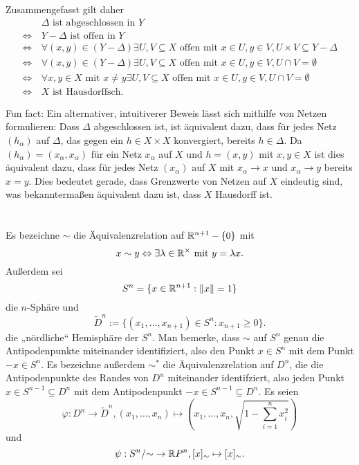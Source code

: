\documentclass[a4paper,10pt]{article}
\begin{document}
Zusammengefasst gilt daher
\begin{align*}
                &\, \Delta \text{ ist abgeschlossen in } Y \\
 \Leftrightarrow&\, Y-\Delta \text{ ist offen in } Y \\
 \Leftrightarrow&\, \forall (x,y) \in (Y-\Delta) \exists U,V \subseteq X \text{ offen mit } x \in U, y \in V, U \times V \subseteq Y-\Delta \\
 \Leftrightarrow&\, \forall (x,y) \in (Y-\Delta) \exists U,V \subseteq X \text{ offen mit } x \in U, y \in V, U \cap V = \emptyset \\
 \Leftrightarrow&\, \forall x,y \in X \text{ mit } x \neq y \exists U,V \subseteq X \text{ offen mit } x \in U, y \in V, U \cap V = \emptyset \\
 \Leftrightarrow&\, X \text{ ist Hausdorffsch.}
\end{align*}

Fun fact: Ein alternativer, intuitiverer Beweis lässt sich mithilfe von Netzen formulieren: Dass $\Delta$ abgeschlossen ist, ist äquivalent dazu, dass für jedes Netz $(h_\alpha)$ auf $\Delta$, das gegen ein $h \in X \times X$ konvergiert, bereits $h \in \Delta$. Da $(h_\alpha) = (x_\alpha, x_\alpha)$ für ein Netz $x_\alpha$ auf $X$ und $h = (x,y)$ mit $x,y \in X$ ist dies äquivalent dazu, dass für jedes Netz $(x_\alpha)$ auf $X$ mit $x_\alpha \to x$ und $x_\alpha \to y$ bereits $x = y$. Dies bedeutet gerade, dass Grenzwerte von Netzen auf $X$ eindeutig sind, was bekanntermaßen äquivalent dazu ist, dass $X$ Hausdorff ist.





\section{}
Es bezeichne $\sim$ die Äquivalenzrelation auf $\mathbb{R}^{n+1} - \{0\}$ mit
\[
 x \sim y \Leftrightarrow \exists \lambda \in \mathbb{R}^\times \text{ mit } y = \lambda x.
\]
Außerdem sei
\[
 S^n = \{x \in \mathbb{R}^{n+1} : \|x\|=1\}
\]
die $n$-Sphäre und
\[
 \tilde{D}^n := \{(x_1, \ldots, x_{n+1}) \in S^n : x_{n+1} \geq 0\}.
\]
die „nördliche“ Hemisphäre der $S^n$. Man bemerke, dass $\sim$ auf $S^n$ genau die Antipodenpunkte miteinander identifiziert, also den Punkt $x \in S^n$ mit dem Punkt $-x \in S^n$.
Es bezeichne außerdem $\sim^*$ die Äquivalenzrelation auf $D^n$, die die Antipodenpunkte des Randes von $D^n$ miteinander identifziert, also jeden Punkt $x \in S^{n-1} \subseteq D^n$ mit dem Antipodenpunkt $-x \in S^{n-1} \subseteq D^n$. Es seien
\[
 \varphi : D^n \to \tilde{D}^n, (x_1, \ldots, x_n) \mapsto \left(x_1, \ldots, x_n, \sqrt{1-\sum_{i=1}^n x_i^2}\right)
\]
und
\[
 \psi : S^n/{\sim} \to \mathbb{R} P^n, [x]_\sim \mapsto [x]_\sim.
\]
\end{document}
